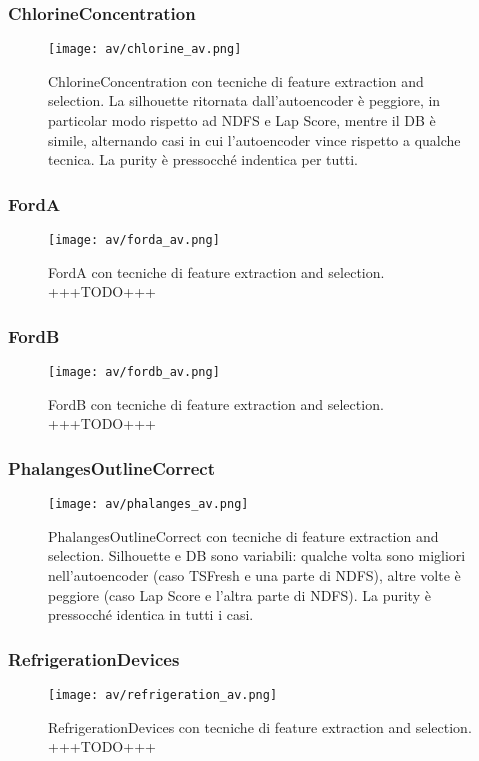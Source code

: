 \subsubsection{ChlorineConcentration}
\begin{figure}[H]
	\centering
	\texttt{[image: av/chlorine\_av.png]}
	\caption{ChlorineConcentration con tecniche di feature extraction and selection. La silhouette ritornata dall'autoencoder è peggiore, in particolar modo rispetto ad NDFS e Lap Score, mentre il DB è simile, alternando casi in cui l'autoencoder vince rispetto a qualche tecnica. La purity è pressocché indentica per tutti.}
	\label{fig:chlorine_av}
\end{figure}

\subsubsection{FordA}
\begin{figure}[H]
	\centering
	\texttt{[image: av/forda\_av.png]}
	\caption{FordA con tecniche di feature extraction and selection. +++TODO+++}
	\label{fig:forda_av}
\end{figure}

\subsubsection{FordB}
\begin{figure}[H]
	\centering
	\texttt{[image: av/fordb\_av.png]}
	\caption{FordB con tecniche di feature extraction and selection. +++TODO+++}
	\label{fig:fordb_av}
\end{figure}

\subsubsection{PhalangesOutlineCorrect}
\begin{figure}[H]
	\centering
	\texttt{[image: av/phalanges\_av.png]}
	\caption{PhalangesOutlineCorrect con tecniche di feature extraction and selection. Silhouette e DB sono variabili: qualche volta sono migliori nell'autoencoder (caso TSFresh e una parte di NDFS), altre volte è peggiore (caso Lap Score e l'altra parte di NDFS). La purity è pressocché identica in tutti i casi.}
	\label{fig:phalanges_av}
\end{figure}

\subsubsection{RefrigerationDevices}
\begin{figure}[H]
	\centering
	\texttt{[image: av/refrigeration\_av.png]}
	\caption{RefrigerationDevices con tecniche di feature extraction and selection. +++TODO+++}
	\label{fig:refrigeration_av}
\end{figure}

